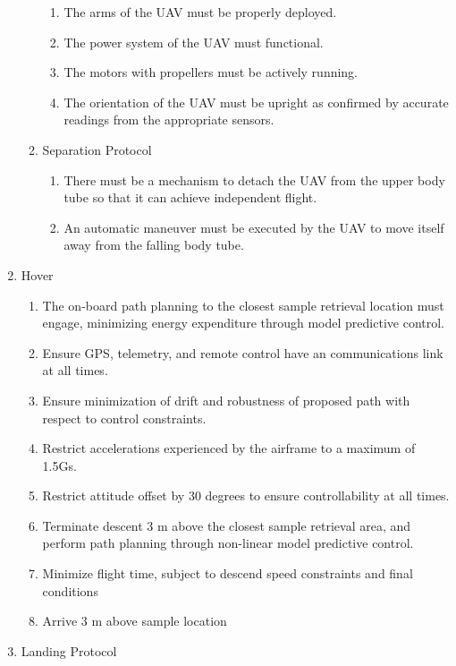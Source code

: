 \begin{enumerate}[noitemsep, label=\arabic*.]
\begin{enumerate}[noitemsep, label=1.\arabic*.]
\begin{enumerate}[noitemsep, label=1.4.\arabic*.]
						\item The arms of the UAV must be properly deployed.
						\item The power system of the UAV must functional.
						\item The motors with propellers must be actively running.
						\item The orientation of the UAV must be upright as confirmed by accurate readings from the appropriate sensors.
					\end{enumerate}
				\item Separation Protocol
					\begin{enumerate}[noitemsep, label=1.5.\arabic*.]
						\item There must be a mechanism to detach the UAV from the upper body tube so that it can achieve independent flight.
						\item An automatic maneuver must be executed by the UAV to move itself away from the falling body tube.
					\end{enumerate}
			\end{enumerate}
		\item Hover
			\begin{enumerate}[noitemsep, label=2.\arabic*.]
				\item The on-board path planning to the closest sample retrieval location must engage, minimizing energy expenditure through model predictive control.
				\item Ensure GPS, telemetry, and remote control have an communications link at all times.
				\item Ensure minimization of drift and robustness of proposed path with respect to control constraints.
				\item Restrict accelerations experienced by the airframe to a maximum of 1.5Gs.
				\item Restrict attitude offset by 30 degrees to ensure controllability at all times.
				\item Terminate descent 3 m above the closest sample retrieval area, and perform path planning through non-linear model predictive control.
				\item Minimize flight time, subject to descend speed constraints and final conditions
				\item Arrive 3 m above sample location
			\end{enumerate}
		\item Landing Protocol
			\begin{enumerate}[noitemsep, label=3.\arabic*.]

\end{enumerate}
\end{enumerate}
